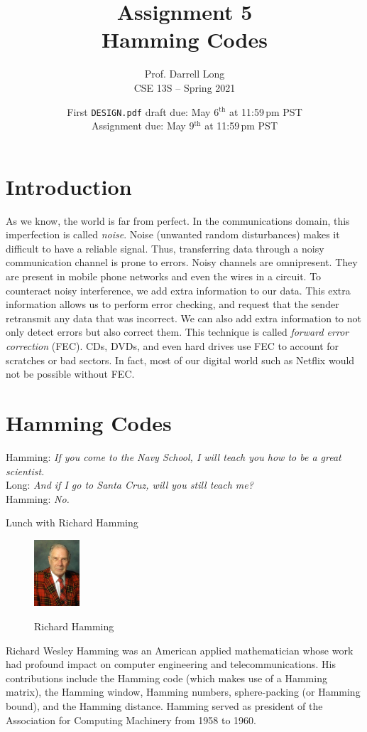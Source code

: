 \documentclass[11pt]{article}
\title{Assignment 5 \\ Hamming Codes}
\author{Prof. Darrell Long \\ CSE 13S -- Spring 2021}
\date{
  First \texttt{DESIGN.pdf} draft due: May 6$^\text{th}$ at 11:59\,pm PST \\
  Assignment due: May 9$^\text{th}$ at 11:59\,pm PST
}
\begin{document}
\maketitle

\section{Introduction}

As we know, the world is far from perfect. In the communications domain,
this imperfection is called \emph{noise}. Noise (unwanted random
disturbances) makes it difficult to have a reliable signal. Thus,
transferring data through a noisy communication channel is prone to
errors. Noisy channels are omnipresent. They are present in mobile
phone networks and even the wires in a circuit. To counteract noisy
interference, we add extra information to our data. This extra
information allows us to perform error checking, and request that the
sender retransmit any data that was incorrect. We can also add extra
information to not only detect errors but also correct them. This
technique is called \emph{forward error correction} (FEC). CDs, DVDs,
and even hard drives use FEC to account for scratches or bad sectors. In
fact, most of our digital world such as Netflix would not be possible
without FEC.

\section{Hamming Codes}

\textwidth
\epigraph{
  Hamming: \emph{If you come to the Navy School, I will teach you how to be a great scientist.}\\
  Long: \emph{And if I go to Santa Cruz, will you still teach me?}\\
  Hamming: \emph{No.}
}{Lunch with Richard Hamming}

\begin{figure}
\includegraphics[width=0.15\textwidth]{images/hamming.jpeg}
\centerline{\small Richard Hamming}
\end{figure}

Richard Wesley Hamming was an American applied mathematician whose work
had profound impact on computer engineering and telecommunications. His
contributions include the Hamming code (which makes use of a Hamming
matrix), the Hamming window, Hamming numbers, sphere-packing (or Hamming
bound), and the Hamming distance. Hamming served as president of the
Association for Computing Machinery from 1958 to 1960.
\end{document}
